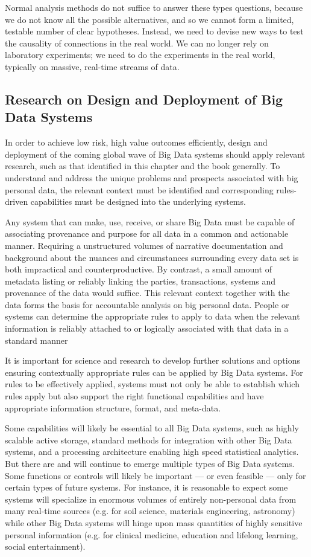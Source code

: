 Normal analysis methods do not suffice to answer these types questions, because we do not know all the possible alternatives, and so we cannot form a limited, testable number of clear hypotheses.
Instead, we need to devise new ways to test the causality of connections in the real world.
We can no longer rely on laboratory experiments; we need to do the experiments in the real world, typically on massive, real-time streams of data.

\subsection{Research on Design and Deployment of Big Data Systems}

In order to achieve low risk, high value outcomes efficiently, design and deployment of the coming global wave of Big Data systems should apply relevant research, such as that identified in this chapter and the book generally.
To understand and address the unique problems and prospects associated with big personal data, the relevant context must be identified and corresponding rules-driven capabilities must be designed into the underlying systems.

Any system that can make, use, receive, or share Big Data must be capable of associating provenance and purpose for all data in a common and actionable manner.
Requiring a unstructured volumes of narrative documentation and background about the nuances and circumstances surrounding every data set is both impractical and counterproductive.
By contrast, a small amount of metadata listing or reliably linking the parties, transactions, systems and provenance of the data would suffice.
This relevant context together with the data forms the basis for accountable analysis on big personal data.  People or systems can determine the appropriate rules to apply to data when the relevant information is reliably attached to or logically associated with that data in a standard manner 

It is important for science and research to develop further solutions and options ensuring contextually appropriate rules can be applied by Big Data systems.
For rules to be effectively applied, systems must not only be able to establish which rules apply but also support the right functional capabilities and have appropriate information structure, format, and meta-data.

Some capabilities will likely be essential to all Big Data systems, such as highly scalable active storage, standard methods for integration with other Big Data systems, and a processing architecture enabling high speed statistical analytics.
But there are and will continue to emerge multiple types of Big Data systems.
Some functions or controls will likely be important --- or even feasible --- only for certain types of future systems.
For instance, it is reasonable to expect some systems will specialize in enormous volumes of entirely non-personal data from many real-time sources (e.g. for soil science, materials engineering, astronomy) while other Big Data systems will hinge upon mass quantities of highly sensitive personal information (e.g. for clinical medicine, education and lifelong learning, social entertainment).

